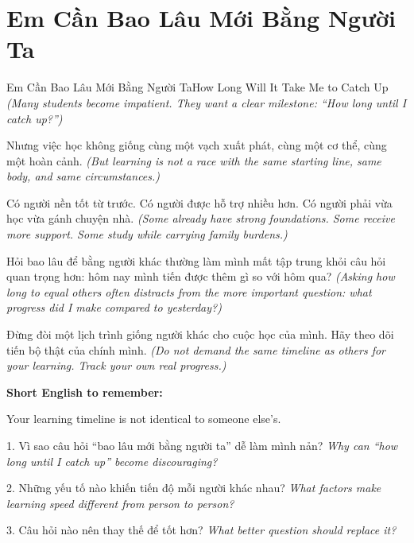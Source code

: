 \section{Em Cần Bao Lâu Mới Bằng Người Ta}
\begin{truyen}{Em Cần Bao Lâu Mới Bằng Người Ta}{How Long Will It Take Me to Catch Up}
\textit{(Many students become impatient. They want a clear milestone: “How long until I catch up?”)}

Nhưng việc học không giống cùng một vạch xuất phát, cùng một cơ thể, cùng một hoàn cảnh.
\textit{(But learning is not a race with the same starting line, same body, and same circumstances.)}

Có người nền tốt từ trước. Có người được hỗ trợ nhiều hơn. Có người phải vừa học vừa gánh chuyện nhà.
\textit{(Some already have strong foundations. Some receive more support. Some study while carrying family burdens.)}

Hỏi bao lâu để bằng người khác thường làm mình mất tập trung khỏi câu hỏi quan trọng hơn: hôm nay mình tiến được thêm gì so với hôm qua?
\textit{(Asking how long to equal others often distracts from the more important question: what progress did I make compared to yesterday?)}
\end{truyen}

\begin{baihoc}
Đừng đòi một lịch trình giống người khác cho cuộc học của mình. Hãy theo dõi tiến bộ thật của chính mình.
\textit{(Do not demand the same timeline as others for your learning. Track your own real progress.)}
\end{baihoc}

\begin{ghinhoanh}
\textbf{Short English to remember:}

Your learning timeline is not identical to someone else's.

\end{ghinhoanh}

\begin{tuhocnhanh}
1. Vì sao câu hỏi “bao lâu mới bằng người ta” dễ làm mình nản? \textit{Why can “how long until I catch up” become discouraging?}

2. Những yếu tố nào khiến tiến độ mỗi người khác nhau? \textit{What factors make learning speed different from person to person?}

3. Câu hỏi nào nên thay thế để tốt hơn? \textit{What better question should replace it?}
\end{tuhocnhanh}
\ngancach

